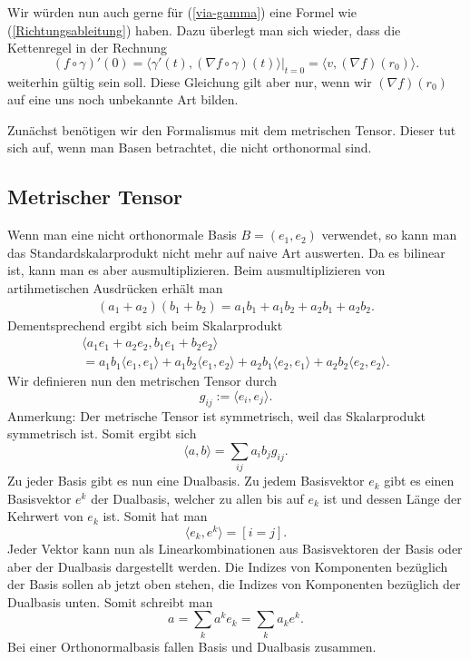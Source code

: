 \documentclass[a4paper,12pt,fleqn]{article}
\begin{document}
Wir würden nun auch gerne für (\ref{via-gamma}) eine Formel
wie (\ref{Richtungsableitung}) haben. Dazu überlegt man sich wieder,
dass die Kettenregel in der Rechnung
\begin{equation}
(f\circ\gamma)'(0)
= \langle \gamma'(t),(\nabla f\circ\gamma)(t)\rangle\Big|_{t=0}
= \langle v,(\nabla f)(r_0)\rangle.
\end{equation}
weiterhin gültig sein soll. Diese Gleichung gilt aber nur,
wenn wir \((\nabla f)(r_0)\) auf eine uns noch unbekannte Art
bilden.

Zunächst benötigen wir den Formalismus mit dem metrischen Tensor.
Dieser tut sich auf, wenn man Basen betrachtet, die nicht
orthonormal sind.

\subsection{Metrischer Tensor}

Wenn man eine nicht orthonormale Basis \(B=(e_1,e_2)\) verwendet,
so kann man das Standardskalarprodukt nicht mehr auf naive Art
auswerten. Da es bilinear ist, kann man es aber ausmultiplizieren.
Beim ausmultiplizieren von artihmetischen Ausdrücken erhält man
\begin{gather*}
(a_1+a_2)(b_1+b_2)
= a_1b_1+a_1b_2+a_2b_1+a_2b_2.
\end{gather*}
Dementsprechend ergibt sich beim Skalarprodukt
\begin{gather*}
\langle a_1e_1+a_2e_2, b_1e_1+b_2e_2\rangle\\
= a_1b_1\langle e_1,e_1\rangle
+ a_1b_2\langle e_1,e_2\rangle
+ a_2b_1\langle e_2,e_1\rangle
+ a_2b_2\langle e_2,e_2\rangle.
\end{gather*}
Wir definieren nun den metrischen Tensor durch
\begin{equation}
g_{ij} := \langle e_i,e_j\rangle.
\end{equation}
Anmerkung: Der metrische Tensor ist symmetrisch, weil das
Skalarprodukt symmetrisch ist. Somit ergibt sich
\begin{equation}\label{SP}
\langle a,b\rangle =  \sum_{ij} a_ib_j g_{ij}.
\end{equation}
Zu jeder Basis gibt es nun eine Dualbasis. Zu jedem Basisvektor
\(e_k\) gibt es einen Basisvektor \(e^k\) der Dualbasis, welcher
zu allen bis auf \(e_k\) ist und dessen Länge der Kehrwert
von \(e_k\) ist. Somit hat man
\begin{equation}\label{dual}
\langle e_k,e^k\rangle = [i=j].
\end{equation}
Jeder Vektor kann nun als Linearkombinationen aus Basisvektoren
der Basis oder aber der Dualbasis dargestellt werden. Die Indizes
von Komponenten bezüglich der Basis sollen ab jetzt oben stehen,
die Indizes von Komponenten bezüglich der Dualbasis unten. Somit
schreibt man
\begin{equation}
a = \sum_k a^k e_k = \sum_k a_k e^k.
\end{equation}
Bei einer Orthonormalbasis fallen Basis und Dualbasis zusammen.
\end{document}

